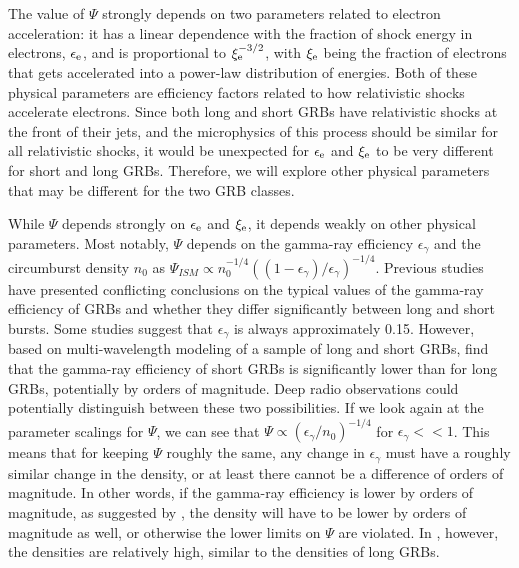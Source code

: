 \documentclass[12pt]{article}
\begin{document}
The value of $\Psi$ strongly depends on two parameters related to electron acceleration: it has a linear dependence with the fraction of shock energy in electrons, $\epsilon_{\rm{e}}$, and is proportional to $\xi_{\rm{e}}^{-3/2}$, with $\xi_{\rm{e}}$ being the fraction of electrons that gets accelerated into a power-law distribution of energies. Both of these physical parameters are efficiency factors related to how relativistic shocks accelerate electrons. Since both long and short GRBs have relativistic shocks at the front of their jets, and the microphysics of this process should be similar for all relativistic shocks, it would be unexpected for $\epsilon_{\rm{e}}$ and $\xi_{\rm{e}}$ to be very different for short and long GRBs. Therefore, we will explore other physical parameters that may be different for the two GRB classes.

While $\Psi$ depends strongly on $\epsilon_{\rm{e}}$ and $\xi_{\rm{e}}$, it depends weakly on other physical parameters. Most notably, $\Psi$ depends on the gamma-ray efficiency $\epsilon_{\gamma}$ and the circumburst density $n_0$ as $\Psi_{ISM}\propto n_0^{-1/4} ((1-\epsilon_{\gamma})/\epsilon_{\gamma})^{-1/4}$. 
Previous studies have presented conflicting conclusions on the typical values of the gamma-ray efficiency of GRBs and whether they differ significantly between long and short bursts. Some studies \citep{10.1111/j.1365-2966.2006.10280.x,10.1093/mnras/stv2033,10.1093/mnras/stw1331} suggest that $\epsilon_{\gamma}$ is always approximately 0.15. However, based on multi-wavelength modeling of a sample of long and short GRBs, \citet{2022MNRAS.511.2848A} find that the gamma-ray efficiency of short GRBs is significantly lower than for long GRBs, potentially by orders of magnitude. Deep radio observations could potentially distinguish between these two possibilities. If we look again at the parameter scalings for $\Psi$, we can see that $\Psi\propto (\epsilon_{\gamma}/n_0)^{-1/4}$ for $\epsilon_{\gamma} << 1$. This means that for keeping $\Psi$ roughly the same, any change in $\epsilon_{\gamma}$ must have a roughly similar change in the density, or at least there cannot be a difference of orders of magnitude. In other words, if the gamma-ray efficiency is lower by orders of magnitude, as suggested by \citet{2022MNRAS.511.2848A}, the density will have to be lower by orders of magnitude as well, or otherwise the lower limits on $\Psi$ are violated. In \citet{2022MNRAS.511.2848A}, however, the densities are relatively high, similar to the densities of long GRBs.
\end{document}
